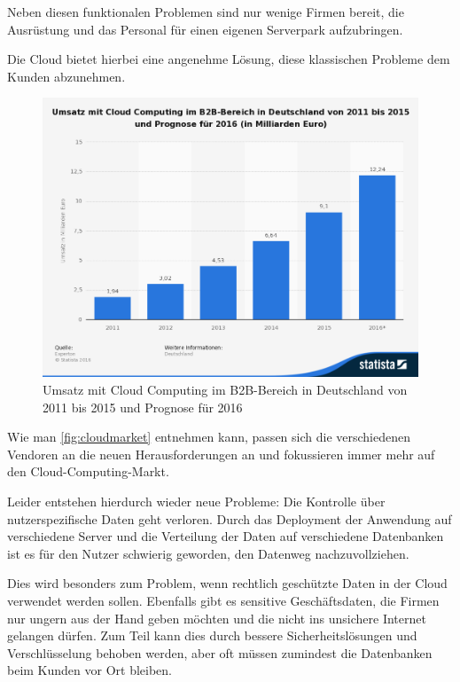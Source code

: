 Neben diesen funktionalen Problemen sind nur wenige Firmen bereit, die Ausrüstung und das Personal für einen eigenen Serverpark aufzubringen.

Die Cloud bietet hierbei eine angenehme Lösung, diese klassischen Probleme dem Kunden abzunehmen.

\begin{figure}[hbt]
	\centering
	\includegraphics[scale=0.5]{images/cloud-computing-market}
	\caption{Umsatz mit Cloud Computing im B2B-Bereich in Deutschland von 2011 bis 2015 und Prognose für 2016 \parencite{statistia.2015}}
	\label{fig:cloudmarket}
\end{figure}

Wie man \autoref{fig:cloudmarket} entnehmen kann, passen sich die verschiedenen Vendoren an die neuen Herausforderungen an und fokussieren immer mehr auf den Cloud-Computing-Markt.

Leider entstehen hierdurch wieder neue Probleme: Die Kontrolle über nutzerspezifische Daten geht verloren. Durch das Deployment der Anwendung auf verschiedene Server und die Verteilung der Daten auf verschiedene Datenbanken ist es für den Nutzer schwierig geworden, den Datenweg nachzuvollziehen.

Dies wird besonders zum Problem, wenn rechtlich geschützte Daten in der Cloud verwendet werden sollen. Ebenfalls gibt es sensitive Geschäftsdaten, die Firmen nur ungern aus der Hand geben möchten und die nicht ins unsichere Internet gelangen dürfen.
Zum Teil kann dies durch bessere Sicherheitslösungen und Verschlüsselung behoben werden, aber oft müssen zumindest die Datenbanken beim Kunden vor Ort bleiben. 

